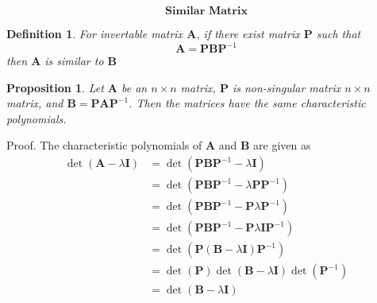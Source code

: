 \documentclass{book}
\begin{document}
\newtheorem{propo}{Proposition}[section]
\newtheorem{defin}{Definition}[section]
    \[ \textbf{Similar Matrix} \]
\begin{defin}
    For invertable matrix $\mathbf{A}$, if there exist matrix $\mathbf{P}$ such that
    \[ \mathbf{A}  = \mathbf{P} \mathbf{B} \mathbf{P}^{-1} \]
    then $\mathbf{A}$ is similar to $\mathbf{B}$
\end{defin}

\begin{propo}
Let $\mathbf{A}$ be an $n \times n$ matrix, $\mathbf{P}$ is non-singular matrix $n \times n$ matrix, and
$\mathbf{B} = \mathbf{P} \mathbf{A} \mathbf{P}^{-1}$. Then the matrices have the same characteristic polynomials.
\end{propo}
Proof. The characteristic polynomials of $\mathbf{A}$ and $\mathbf{B}$ are given as 
    \begin{equation}
    \begin{aligned}
     \det (\mathbf{A} - \lambda \mathbf{I}) & = \det (\mathbf{P} \mathbf{B} \mathbf{P}^{-1} - \lambda \mathbf{I}) \\
     & = \det (\mathbf{P} \mathbf{B} \mathbf{P}^{-1} - \lambda \mathbf{P} \mathbf{P}^{-1}) \\ 
     & = \det (\mathbf{P} \mathbf{B} \mathbf{P}^{-1} - \mathbf{P} \lambda \mathbf{P}^{-1}) \\
     & = \det (\mathbf{P} \mathbf{B} \mathbf{P}^{-1} - \mathbf{P} \lambda \mathbf{I} \mathbf{P}^{-1})  \\
     & = \det (\mathbf{P} (\mathbf{B} - \lambda \mathbf{I}) \mathbf{P}^{-1}) \\
     & = \det (\mathbf{P}) \det(\mathbf{B} - \lambda \mathbf{I}) \det (\mathbf{P}^{-1}) \\
     & = \det(\mathbf{B} - \lambda \mathbf{I}) \nonumber\\
    \end{aligned}
    \end{equation}
\end{document}
